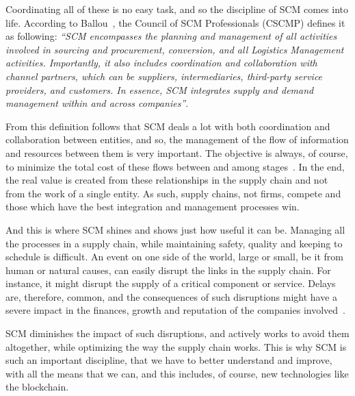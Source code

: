   Coordinating all of these is no easy task, and so the discipline of SCM comes into life. According to Ballou~\cite{Ballou2007}, the Council of SCM Professionals (CSCMP) defines it as following: \textit{“SCM encompasses the planning and management of all activities involved in sourcing and procurement, conversion, and all Logistics Management activities. Importantly, it also includes coordination and collaboration with channel partners, which can be suppliers, intermediaries, third-party service providers, and customers. In essence, SCM integrates supply and demand management within and across companies”}.
  

From this definition follows that SCM deals a lot with both coordination and collaboration between entities, and so, the management of the flow of information and resources between them is very important. The objective is always, of course, to minimize the total cost of these flows between and among stages~\cite{Habib2011}.
In the end, the real value is created from these relationships in the supply chain and not from the work of a single entity. As such, supply chains, not firms, compete and those which have the best integration and management processes win.

 
And this is where SCM shines and shows just how useful it can be. Managing all the processes in a supply chain, while maintaining safety, quality and keeping to schedule is difficult. An event on one side of the world, large or small, be it from human or natural causes, can easily disrupt the links in the supply chain. For instance, it might disrupt the supply of a critical component or service. Delays are, therefore, common, and the consequences of such disruptions might have a severe impact in the finances, growth and reputation of the companies involved~\cite{Punter2013}.

SCM diminishes the impact of such disruptions, and actively works to avoid them altogether, while optimizing the way the supply chain works. This is why SCM is such an important discipline, that we have to better understand and improve, with all the means that we can, and this includes, of course, new technologies like the blockchain.


